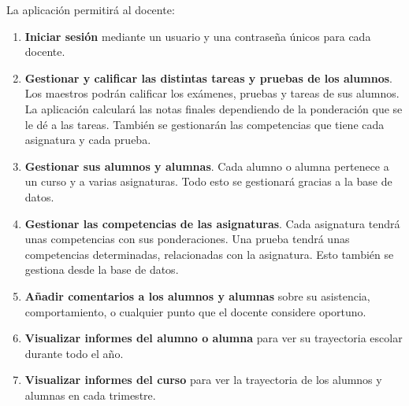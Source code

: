 La aplicación permitirá al docente:
\begin{enumerate}
	\item \textbf{Iniciar sesión} mediante un usuario y una contraseña únicos para cada docente.
	\item \textbf{Gestionar y calificar las distintas tareas y pruebas de los alumnos}. Los maestros podrán calificar los exámenes, pruebas y tareas de sus alumnos. La aplicación calculará las notas finales dependiendo de la ponderación que se le dé a las tareas. También se gestionarán las competencias que tiene cada asignatura y cada prueba.
	\item \textbf{Gestionar sus alumnos y alumnas}. Cada alumno o alumna pertenece a un curso y a varias asignaturas. Todo esto se gestionará gracias a la base de datos.
	\item \textbf{Gestionar las competencias de las asignaturas}. Cada asignatura tendrá unas competencias con sus ponderaciones. Una prueba tendrá unas competencias determinadas, relacionadas con la asignatura. Esto también se gestiona desde la base de datos.
	\item \textbf{Añadir comentarios a los alumnos y alumnas} sobre su asistencia, comportamiento, o cualquier punto que el docente considere oportuno.
	\item \textbf{Visualizar informes del alumno o alumna} para ver su trayectoria escolar durante todo el año.
	\item \textbf{Visualizar informes del curso} para ver la trayectoria de los alumnos y alumnas en cada trimestre.
	

\end{enumerate}

